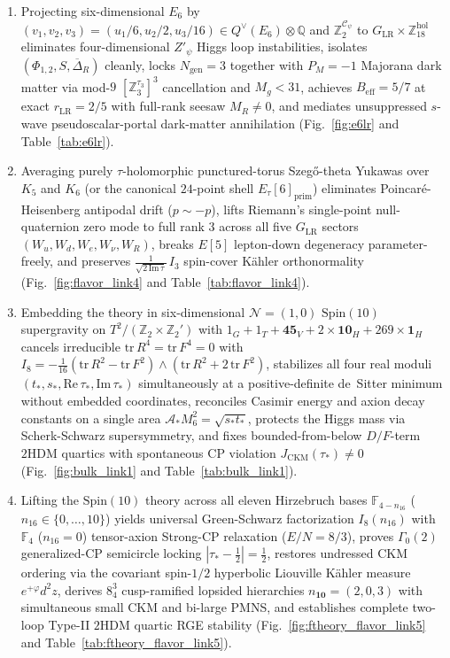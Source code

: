 \documentclass[aps,prd,twocolumn,nofootinbib,floatfix]{revtex4-2}
\begin{document}
\begin{enumerate}
    \item Projecting six-dimensional $E_6$ by $(v_1, v_2, v_3) = (u_1/6, u_2/2, u_3/16) \in Q^\vee(E_6)\otimes\mathbb{Q}$ and $\mathbb{Z}_2^{\mathcal{C}_\psi}$ to $G_{\mathrm{LR}}\times\mathbb{Z}_{18}^{\mathrm{hol}}$ eliminates four-dimensional $Z'_\psi$ Higgs loop instabilities, isolates $(\Phi_{1,2}, S, \overline{\Delta}_R)$ cleanly, locks $N_{\mathrm{gen}} = 3$ together with $P_M = -1$ Majorana dark matter via mod-$9$ $[\mathbb{Z}_3^{\tau_3}]^3$ cancellation and $M_g < 31$, achieves $B_{\mathrm{eff}} = 5/7$ at exact $r_{\mathrm{LR}} = 2/5$ with full-rank seesaw $M_R \ne 0$, and mediates unsuppressed $s$-wave pseudoscalar-portal dark-matter annihilation (Fig.~\ref{fig:e6lr} and Table~\ref{tab:e6lr}).
    \item Averaging purely $\tau$-holomorphic punctured-torus Szeg\H{o}-theta Yukawas over $K_5$ and $K_6$ (or the canonical $24$-point shell $E_\tau[6]_{\mathrm{prim}}$) eliminates Poincar\'e-Heisenberg antipodal drift ($p \sim -p$), lifts Riemann's single-point null-quaternion zero mode to full rank $3$ across all five $G_{\mathrm{LR}}$ sectors $(W_u, W_d, W_e, W_\nu, W_R)$, breaks $E[5]$ lepton-down degeneracy parameter-freely, and preserves $\frac{1}{\sqrt{2\,\mathrm{Im}\,\tau}}\,I_3$ spin-cover K\"ahler orthonormality (Fig.~\ref{fig:flavor_link4} and Table~\ref{tab:flavor_link4}).
    \item Embedding the theory in six-dimensional $\mathcal{N}=(1,0)$ $\mathrm{Spin}(10)$ supergravity on $T^2/(\mathbb{Z}_2\times\mathbb{Z}_2')$ with $1_G + 1_T + \mathbf{45}_V + 2\times\mathbf{10}_H + 269\times\mathbf{1}_H$ cancels irreducible $\mathrm{tr}\,R^4 = \mathrm{tr}\,F^4 = 0$ with $I_8 = -\frac{1}{16}(\mathrm{tr}\,R^2-\mathrm{tr}\,F^2)\wedge(\mathrm{tr}\,R^2+2\,\mathrm{tr}\,F^2)$, stabilizes all four real moduli $(t_*, s_*, \mathrm{Re}\,\tau_*, \mathrm{Im}\,\tau_*)$ simultaneously at a positive-definite de~Sitter minimum without embedded coordinates, reconciles Casimir energy and axion decay constants on a single area $\mathcal{A}_* M_6^2 = \sqrt{s_* t_*}$, protects the Higgs mass via Scherk-Schwarz supersymmetry, and fixes bounded-from-below $D/F$-term $2\mathrm{HDM}$ quartics with spontaneous CP violation $J_{\mathrm{CKM}}(\tau_*) \ne 0$ (Fig.~\ref{fig:bulk_link1} and Table~\ref{tab:bulk_link1}).
    \item Lifting the $\mathrm{Spin}(10)$ theory across all eleven Hirzebruch bases $\mathbb{F}_{4-n_{16}}$ ($n_{16} \in \{0,\dots,10\}$) yields universal Green-Schwarz factorization $I_8(n_{16})$ with $\mathbb{F}_4$ ($n_{16}=0$) tensor-axion Strong-CP relaxation ($E/N = 8/3$), proves $\Gamma_0(2)$ generalized-CP semicircle locking $|\tau_* - \frac{1}{2}| = \frac{1}{2}$, restores undressed CKM ordering via the covariant spin-$1/2$ hyperbolic Liouville K\"ahler measure $e^{+\varphi}d^2z$, derives $8^3_4$ cusp-ramified lopsided hierarchies $n_{\mathbf{10}} = (2,0,3)$ with simultaneous small CKM and bi-large PMNS, and establishes complete two-loop Type-II $2\mathrm{HDM}$ quartic RGE stability (Fig.~\ref{fig:ftheory_flavor_link5} and Table~\ref{tab:ftheory_flavor_link5}).

\end{enumerate}
\end{document}
